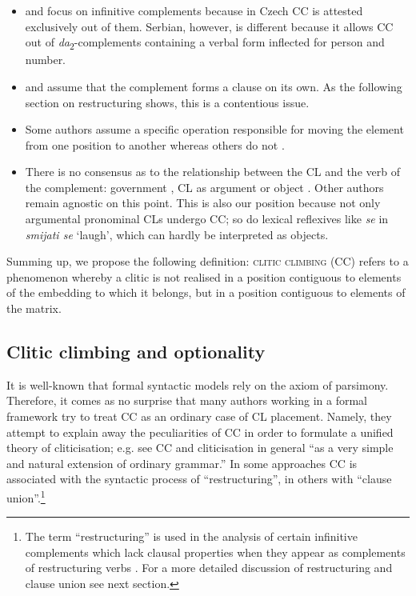 \begin{itemize}
\item \citet{Hana07} and \citet{Rezac05} focus on infinitive complements because in Czech CC is attested exclusively out of them. Serbian, however, is different because it allows CC out of \textit{da}\textsubscript{2}-complements containing a verbal form inflected for person and number. 
\item \citet{SpencerLuis12} and  \citet{Aljovic04} assume that the complement forms a clause on its own. As the following section on restructuring shows, this is a contentious issue. 
\item Some authors assume a specific operation responsible for moving the element from one position to another \citep{Hana07, Aljovic04, Junghanns02} whereas others do not \citep{Rezac05, Dotlacil04, Slodowicz08}.
\item There is no consensus as to the relationship between  the CL and the verb of the complement: government \citep{Hana07}, CL as argument \citep{Rezac05} or object \citep{Slodowicz08}. Other authors remain agnostic on this point. This is also our position because not only argumental pronominal CLs undergo CC; so do lexical reflexives like \textit{se} in \textit{smijati se} ‘laugh’, which can hardly be interpreted as objects. 
\end{itemize}

Summing up, we propose the following definition: \textsc{clitic climbing} (CC) refers to a phenomenon whereby a clitic is not realised in a position contiguous to elements of the embedding to which it belongs, but in a position contiguous to elements of the matrix. 

\subsection{Clitic climbing and optionality}
\label{Clitic climbing and optionality}

It is well-known that formal syntactic models rely on the axiom of parsimony. Therefore, it comes as no surprise that many authors working in a formal framework try to treat CC as an ordinary case of CL placement. Namely, they attempt to explain away the peculiarities of CC in order to formulate a unified theory of cliticisation; e.g. \citet[350]{CamdzicHudson2002} see CC and cliticisation in general “as a very simple and natural extension of ordinary grammar.” In some approaches CC is associated with the syntactic process of “restructuring”, in others with “clause union”.\footnote{The term “restructuring” is used in the analysis of certain infinitive complements which lack clausal properties when they appear as complements of restructuring verbs \citep[cf.][2]{Aljovic05}. For a more detailed discussion of restructuring and clause union see next section.}  

